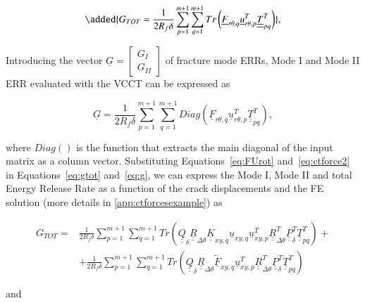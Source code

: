 \documentclass[review]{elsarticle}
\begin{document}
\begin{equation}\label{eq:gtot}
\added{G_{TOT} = \frac{1}{2R_{f}\delta}\sum_{p=1}^{m+1}\sum_{q=1}^{m+1}Tr\left(\underline{F}_{r\theta,q}\underline{u}_{r\theta,p}^{T}\underline{\underline{T}}_{pq}^{T}\right)},
\end{equation}

 Introducing the vector $\underline{G}=\begin{bmatrix}
G_{I} \\
G_{II}
\end{bmatrix}$ of fracture mode ERRs, Mode I and Mode II ERR evaluated with the VCCT can be expressed as 

\begin{equation}\label{eq:g}
\underline{G} =\frac{1}{2R_{f}\delta}\sum_{p=1}^{m+1}\sum_{q=1}^{m+1}Diag\left(\underline{F}_{r\theta,q}\underline{u}_{r\theta,p}^{T}\underline{\underline{T}}_{pq}^{T}\right),
\end{equation}

where $Diag\left(\right)$ is the function that extracts the main diagonal of the input matrix as a column vector. Substituting Equations~\ref{eq:FUrot} and~\ref{eq:ctforce2} in Equations~\ref{eq:gtot} and~\ref{eq:g}, we can express the Mode I, Mode II and total Energy Release Rate as a function of the crack displacements and the FE solution (more details in \ref{app:ctforcesexample}) as 

\begin{equation}\label{eq:gtotlong}
\begin{split}
G_{TOT} =&\frac{1}{2R_{f}\delta}\sum_{p=1}^{m+1}\sum_{q=1}^{m+1}Tr\left(\underline{\underline{Q}}_{\delta}\underline{\underline{R}}_{\Delta\theta}\underline{\underline{K}}_{xy,q}\underline{u}_{xy,q}\underline{u}_{xy,p}^{T}\underline{\underline{R}}_{\Delta\theta}^{T}\underline{\underline{P}}_{\delta}^{T}\underline{\underline{T}}_{pq}^{T}\right)+\\&+\frac{1}{2R_{f}\delta}\sum_{p=1}^{m+1}\sum_{q=1}^{m+1}Tr\left(\underline{\underline{Q}}_{\delta}\underline{\underline{R}}_{\Delta\theta}\underline{\widetilde{F}}_{xy,q}\underline{u}_{xy,p}^{T}\underline{\underline{R}}_{\Delta\theta}^{T}\underline{\underline{P}}_{\delta}^{T}\underline{\underline{T}}_{pq}^{T}\right)
\end{split}
\end{equation}

and
\end{document}
